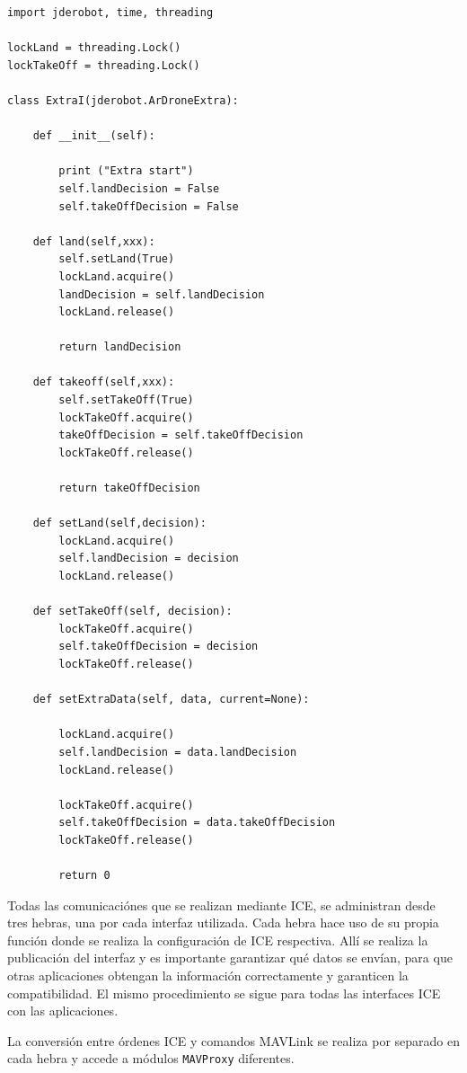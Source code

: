 \begin{lstlisting}[frame=single]
import jderobot, time, threading

lockLand = threading.Lock()
lockTakeOff = threading.Lock()

class ExtraI(jderobot.ArDroneExtra):

    def __init__(self):

        print ("Extra start")
        self.landDecision = False
        self.takeOffDecision = False

    def land(self,xxx):
        self.setLand(True)
        lockLand.acquire()
        landDecision = self.landDecision
        lockLand.release()

        return landDecision

    def takeoff(self,xxx):
        self.setTakeOff(True)
        lockTakeOff.acquire()
        takeOffDecision = self.takeOffDecision
        lockTakeOff.release()

        return takeOffDecision

    def setLand(self,decision):
        lockLand.acquire()
        self.landDecision = decision
        lockLand.release()

    def setTakeOff(self, decision):
        lockTakeOff.acquire()
        self.takeOffDecision = decision
        lockTakeOff.release()

    def setExtraData(self, data, current=None):

        lockLand.acquire()
        self.landDecision = data.landDecision
        lockLand.release()

        lockTakeOff.acquire()
        self.takeOffDecision = data.takeOffDecision
        lockTakeOff.release()

        return 0

\end{lstlisting}  

Todas las comunicaciónes que se realizan mediante ICE, se administran desde tres hebras, una por cada interfaz utilizada. Cada hebra hace uso de su propia función donde se realiza la configuración de ICE respectiva. Allí se realiza la publicación del interfaz y es importante garantizar qué datos se envían, para que otras aplicaciones obtengan la información correctamente y garanticen la compatibilidad. El mismo procedimiento se sigue para todas las interfaces ICE con las aplicaciones.

La conversión entre órdenes ICE y comandos MAVLink se realiza por separado en cada hebra y accede a módulos \texttt{MAVProxy} diferentes.